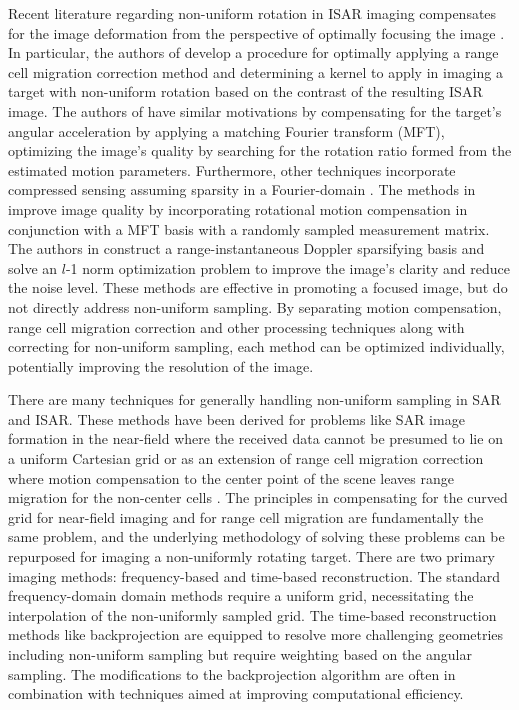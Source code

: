 \documentclass[conference]{IEEEtran}
\begin{document}
Recent literature regarding non-uniform rotation in ISAR imaging compensates for the image deformation from the perspective of optimally focusing the image \cite{Zuo_2020,Vehmas_2016}. In particular, the authors of \cite{Vehmas_2016} develop a procedure for optimally applying a range cell migration correction method and determining a kernel to apply in imaging a target with non-uniform rotation based on the contrast of the resulting ISAR image. The authors of \cite{Zuo_2020} have similar motivations by compensating for the target's angular acceleration by applying a matching Fourier transform (MFT), optimizing the image's quality by searching for the rotation ratio formed from the estimated motion parameters. Furthermore, other techniques incorporate compressed sensing assuming sparsity in a Fourier-domain \cite{Liu_2012, Sun_2015, Zhang_2019}. The methods in \cite{Liu_2012, Zhang_2019} improve image quality by incorporating rotational motion compensation in conjunction with a MFT basis with a randomly sampled measurement matrix. The authors in \cite{Sun_2015} construct a range-instantaneous Doppler sparsifying basis and solve an $l$-1 norm optimization problem to improve the image's clarity and reduce the noise level. These methods are effective in promoting a focused image, but do not directly address non-uniform sampling. By separating motion compensation, range cell migration correction and other processing techniques along with correcting for non-uniform sampling, each method can be optimized individually, potentially improving the resolution of the image.

There are many techniques for generally handling non-uniform sampling in SAR and ISAR. These methods have been derived for problems like SAR image formation in the near-field where the received data cannot be presumed to lie on a uniform Cartesian grid \cite{Subiza_2003} or as an extension of range cell migration correction where motion compensation to the center point of the scene leaves range migration for the non-center cells \cite{Meng_2015}. The principles in compensating for the curved grid for near-field imaging and for range cell migration are fundamentally the same problem, and the underlying methodology of solving these problems can be repurposed for imaging a non-uniformly rotating target. There are two primary imaging methods: frequency-based and time-based reconstruction. The standard frequency-domain domain methods require a uniform grid, necessitating the interpolation of the non-uniformly sampled grid. The time-based reconstruction methods like backprojection are equipped to resolve more challenging geometries including non-uniform sampling but require weighting based on the angular sampling. The modifications to the backprojection algorithm are often in combination with techniques aimed at improving computational efficiency.
\end{document}
